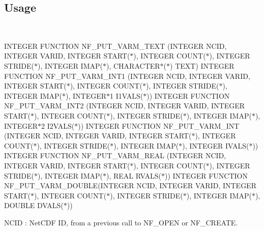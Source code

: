 \subsection*{Usage }

 

I\+N\+T\+E\+G\+ER F\+U\+N\+C\+T\+I\+ON N\+F\+\_\+\+P\+U\+T\+\_\+\+V\+A\+R\+M\+\_\+\+T\+E\+XT (I\+N\+T\+E\+G\+ER N\+C\+ID, I\+N\+T\+E\+G\+ER V\+A\+R\+ID, I\+N\+T\+E\+G\+ER S\+T\+A\+R\+T($\ast$), I\+N\+T\+E\+G\+ER C\+O\+U\+N\+T($\ast$), I\+N\+T\+E\+G\+ER S\+T\+R\+I\+D\+E($\ast$), I\+N\+T\+E\+G\+ER I\+M\+A\+P($\ast$), C\+H\+A\+R\+A\+C\+T\+E\+R$\ast$($\ast$) T\+E\+XT) I\+N\+T\+E\+G\+ER F\+U\+N\+C\+T\+I\+ON N\+F\+\_\+\+P\+U\+T\+\_\+\+V\+A\+R\+M\+\_\+\+I\+N\+T1 (I\+N\+T\+E\+G\+ER N\+C\+ID, I\+N\+T\+E\+G\+ER V\+A\+R\+ID, I\+N\+T\+E\+G\+ER S\+T\+A\+R\+T($\ast$), I\+N\+T\+E\+G\+ER C\+O\+U\+N\+T($\ast$), I\+N\+T\+E\+G\+ER S\+T\+R\+I\+D\+E($\ast$), I\+N\+T\+E\+G\+ER I\+M\+A\+P($\ast$), I\+N\+T\+E\+G\+E\+R$\ast$1 I1\+V\+A\+L\+S($\ast$)) I\+N\+T\+E\+G\+ER F\+U\+N\+C\+T\+I\+ON N\+F\+\_\+\+P\+U\+T\+\_\+\+V\+A\+R\+M\+\_\+\+I\+N\+T2 (I\+N\+T\+E\+G\+ER N\+C\+ID, I\+N\+T\+E\+G\+ER V\+A\+R\+ID, I\+N\+T\+E\+G\+ER S\+T\+A\+R\+T($\ast$), I\+N\+T\+E\+G\+ER C\+O\+U\+N\+T($\ast$), I\+N\+T\+E\+G\+ER S\+T\+R\+I\+D\+E($\ast$), I\+N\+T\+E\+G\+ER I\+M\+A\+P($\ast$), I\+N\+T\+E\+G\+E\+R$\ast$2 I2\+V\+A\+L\+S($\ast$)) I\+N\+T\+E\+G\+ER F\+U\+N\+C\+T\+I\+ON N\+F\+\_\+\+P\+U\+T\+\_\+\+V\+A\+R\+M\+\_\+\+I\+NT (I\+N\+T\+E\+G\+ER N\+C\+ID, I\+N\+T\+E\+G\+ER V\+A\+R\+ID, I\+N\+T\+E\+G\+ER S\+T\+A\+R\+T($\ast$), I\+N\+T\+E\+G\+ER C\+O\+U\+N\+T($\ast$), I\+N\+T\+E\+G\+ER S\+T\+R\+I\+D\+E($\ast$), I\+N\+T\+E\+G\+ER I\+M\+A\+P($\ast$), I\+N\+T\+E\+G\+ER I\+V\+A\+L\+S($\ast$)) I\+N\+T\+E\+G\+ER F\+U\+N\+C\+T\+I\+ON N\+F\+\_\+\+P\+U\+T\+\_\+\+V\+A\+R\+M\+\_\+\+R\+E\+AL (I\+N\+T\+E\+G\+ER N\+C\+ID, I\+N\+T\+E\+G\+ER V\+A\+R\+ID, I\+N\+T\+E\+G\+ER S\+T\+A\+R\+T($\ast$), I\+N\+T\+E\+G\+ER C\+O\+U\+N\+T($\ast$), I\+N\+T\+E\+G\+ER S\+T\+R\+I\+D\+E($\ast$), I\+N\+T\+E\+G\+ER I\+M\+A\+P($\ast$), R\+E\+AL R\+V\+A\+L\+S($\ast$)) I\+N\+T\+E\+G\+ER F\+U\+N\+C\+T\+I\+ON N\+F\+\_\+\+P\+U\+T\+\_\+\+V\+A\+R\+M\+\_\+\+D\+O\+U\+B\+LE(I\+N\+T\+E\+G\+ER N\+C\+ID, I\+N\+T\+E\+G\+ER V\+A\+R\+ID, I\+N\+T\+E\+G\+ER S\+T\+A\+R\+T($\ast$), I\+N\+T\+E\+G\+ER C\+O\+U\+N\+T($\ast$), I\+N\+T\+E\+G\+ER S\+T\+R\+I\+D\+E($\ast$), I\+N\+T\+E\+G\+ER I\+M\+A\+P($\ast$), D\+O\+U\+B\+LE D\+V\+A\+L\+S($\ast$))

{\ttfamily N\+C\+ID} \+: Net\+C\+DF ID, from a previous call to N\+F\+\_\+\+O\+P\+EN or N\+F\+\_\+\+C\+R\+E\+A\+TE.

